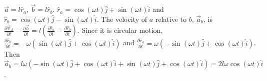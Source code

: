 \documentclass{esg8012pset}
\begin{document}
\begin{solution}
\begin{enumerate}[a.]
        $\vec a = l\hat r_a$, $\vec b = l\hat r_b$.  %
    $\hat r_a = \cos(\omega t)\hat j + \sin(\omega t)\hat i$ and $\hat r_b = \cos(\omega t)\hat j -\sin(\omega t)\hat i$.  The velocity of $a$ relative to $b$, $\vec a_b$, is $\frac{\partial\vec v_A}{\partial t} - \frac{\partial \vec b}{\partial t} = l\left(\frac{\partial\hat r_a}{\partial t} - \frac{\partial \hat r_b}{\partial t}\right)$.  Since it is circular motion, $\frac{\partial \hat r_b}{\partial t} = -\omega(\sin(\omega t)\hat j + \cos(\omega t)\hat i)$ and $\frac{\partial \hat r_a}{\partial t} = \omega(-\sin(\omega t)\hat j + \cos(\omega t)\hat i)$.  Then $\vec a_b = l\omega\left(-\sin(\omega t)\hat j + \cos(\omega t)\hat i + \sin(\omega t)\hat j + \cos(\omega t)\hat i\right) = 2 l \omega \cos(\omega t)\hat i$.
  \end{enumerate}
\end{solution}
\end{document}
